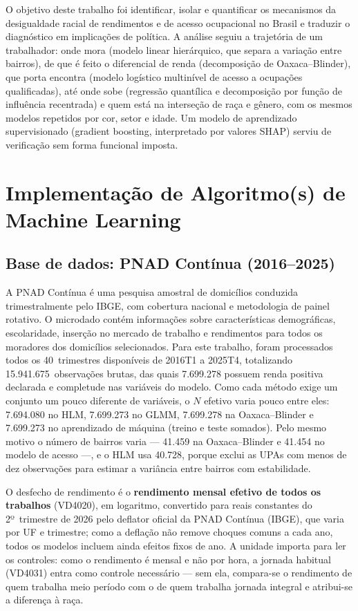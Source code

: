 \documentclass[11pt, a4paper, oneside]{article}
\begin{document}
O objetivo deste trabalho foi identificar, isolar e quantificar os mecanismos da
desigualdade racial de rendimentos e de acesso ocupacional no Brasil e traduzir o
diagnóstico em implicações de política. A análise seguiu a trajetória de um
trabalhador: onde mora (modelo linear hierárquico, que separa a variação entre
bairros), de que é feito o diferencial de renda (decomposição de Oaxaca--Blinder), que
porta encontra (modelo logístico multinível de acesso a ocupações qualificadas), até
onde sobe (regressão quantílica e decomposição por função de influência recentrada) e
quem está na interseção de raça e gênero, com os mesmos modelos repetidos por cor, setor e idade. Um modelo de aprendizado supervisionado
({gradient boosting}, interpretado por valores SHAP) serviu de verificação sem
forma funcional imposta.

\newpage


\section*{Implementação de Algoritmo(s) de Machine Learning}

\subsection*{Base de dados: PNAD Contínua (2016--2025)}

A PNAD Contínua é uma pesquisa amostral de domicílios conduzida
trimestralmente pelo IBGE, com cobertura nacional e metodologia de painel
rotativo. O microdado contém informações sobre características demográficas,
escolaridade, inserção no mercado de trabalho e rendimentos para todos os
moradores dos domicílios selecionados. Para este trabalho, foram processados
todos os 40~trimestres disponíveis de 2016T1 a 2025T4, totalizando
15.941.675~observações brutas, das quais 7.699.278 possuem renda positiva
declarada e completude nas variáveis do modelo. Como cada método exige um conjunto um pouco
diferente de variáveis, o $N$ efetivo varia pouco entre eles: 7.694.080 no HLM,
7.699.273 no GLMM, 7.699.278 na Oaxaca--Blinder e 7.699.273 no aprendizado de máquina
(treino e teste somados). Pelo mesmo motivo o número de bairros varia ---
41.459 na Oaxaca--Blinder e 41.454 no modelo de acesso ---, e o HLM
usa 40.728, porque exclui as UPAs com menos de dez observações para estimar a
variância entre bairros com estabilidade.

O desfecho de rendimento é o \textbf{rendimento mensal efetivo de todos os
trabalhos} (VD4020), em logaritmo, convertido para reais constantes do 2º~trimestre
de 2026 pelo deflator oficial da PNAD Contínua (IBGE), que varia por UF e trimestre;
como a deflação não remove choques comuns a cada ano, todos os modelos incluem ainda
efeitos fixos de ano. A unidade importa para ler os controles: como
o rendimento é mensal e não por hora, a jornada {habitual} (VD4031) entra como
controle necessário --- sem ela, compara-se o rendimento de quem trabalha meio período com
o de quem trabalha jornada integral e atribui-se a diferença à raça.
\end{document}
